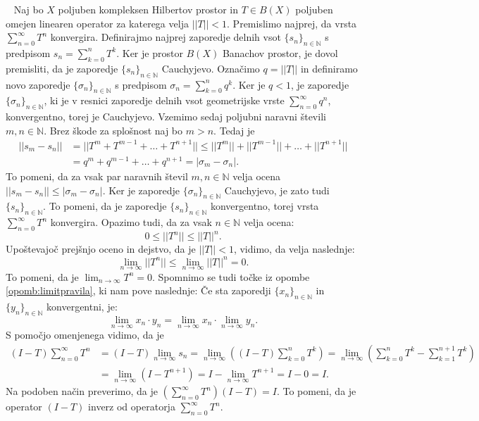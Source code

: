 \documentclass[12pt,a4paper,oneside,fleqn,openany]{book}
\newcommand{\eopf}{\raisebox{0.8ex}{\framebox{}}} %
\newenvironment{dokaz}%
{\noindent{\bf Dokaz.}\ }%
{\hfill\eopf\par\bigskip}%
\newcommand{\N}{\mathbb{N}}
\newcommand{\abs}[1]{\ensuremath{\lvert #1 \rvert}}
\newcommand{\norm}[1]{\abs{\abs{#1}}}
\begin{document}
\begin{dokaz}
	Naj bo $X$ poljuben kompleksen Hilbertov prostor in $T\in B(X)$ poljuben omejen linearen operator za katerega velja $\norm{T}< 1$. Premislimo najprej, da vrsta $\sum_{n=0}^{\infty}T^n$ konvergira. Definirajmo najprej zaporedje delnih vsot $\{s_n\}_{n\in\N}$ s predpisom $s_n = \sum_{k=0}^{n}T^k$. Ker je prostor $B(X)$ Banachov prostor, je dovol premisliti, da je zaporedje $\{s_n\}_{n\in\N}$ Cauchyjevo. Označimo $q = \norm{T}$ in definiramo novo zaporedje $\{\sigma_n\}_{n\in\N}$ s predpisom $\sigma_n = \sum_{k=0}^{n}q^k$. Ker je $q<1$, je zaporedje $\{\sigma_n\}_{n\in\N}$, ki je v resnici zaporedje delnih vsot geometrijske vrste $\sum_{n=0}^{\infty}q^n$, konvergentno, torej je Cauchyjevo. Vzemimo sedaj poljubni naravni števili $m, n\in\N$. Brez škode za splošnost naj bo $m>n$. Tedaj je \begin{align*}
		\norm{s_m - s_n}&=\norm{T^m + T^{m-1}+\ldots+T^{n+1}}\leq\norm{T^m} + \norm{T^{m-1}}+\ldots+\norm{T^{n+1}} \\
		&= q^m + q^{m-1} + \ldots + q^{n+1} = \abs{\sigma_m - \sigma_n}.
	\end{align*} To pomeni, da za vsak par naravnih števil $m, n\in\N$ velja ocena $\norm{s_m - s_n}\leq \abs{\sigma_m - \sigma_n}$. Ker je zaporedje $\{\sigma_n\}_{n\in\N}$ Cauchyjevo, je zato tudi $\{s_n\}_{n\in\N}$. To pomeni, da je zaporedje $\{s_n\}_{n\in\N}$ konvergentno, torej vrsta $\sum_{n=0}^{\infty}T^n$ konvergira. Opazimo tudi, da za vsak $n\in\N$ velja ocena: $$0\leq \norm{T^n}\leq \norm{T}^n.$$ Upoštevajoč prejšnjo oceno in dejstvo, da je $\norm{T}<1$, vidimo, da velja naslednje: $$\lim_{n\to \infty}\norm{T^n}\leq \lim_{n\to \infty}\norm{T}^n = 0.$$ To pomeni, da je $\lim_{n\to \infty}T^n = 0$. Spomnimo se tudi točke iz opombe \ref{opomb:limitpravila}, ki nam pove naslednje: Če sta zaporedji $\{x_n\}_{n\in\N}$ in $\{y_n\}_{n\in\N}$ konvergentni, je: $$\lim_{n\to\infty}x_n\cdot y_n = \lim_{n\to\infty}x_n \cdot \lim_{n\to \infty}y_n.$$ S pomočjo omenjenega vidimo, da je \begin{align*}
	(I-T)\sum_{n = 0}^\infty T^n &= (I-T)\lim_{n\to \infty}s_n = \lim_{n\to \infty}\left((I-T)\sum_{k=0}^n T^k\right) = \lim_{n\to \infty}\left(\sum_{k=0}^nT^k - \sum_{k=1}^{n+1}T^k\right) \\ &= \lim_{n\to\infty}\left(I-T^{n+1}\right) = I - \lim_{n\to \infty}T^{n+1} = I-0 = I.
	\end{align*}
	Na podoben način preverimo, da je $\left(\sum_{n = 0}^\infty T^n\right)(I-T) = I$. To pomeni, da je operator $(I-T)$ inverz od operatorja $\sum_{n = 0}^\infty T^n $.
\end{dokaz}
\end{document}
